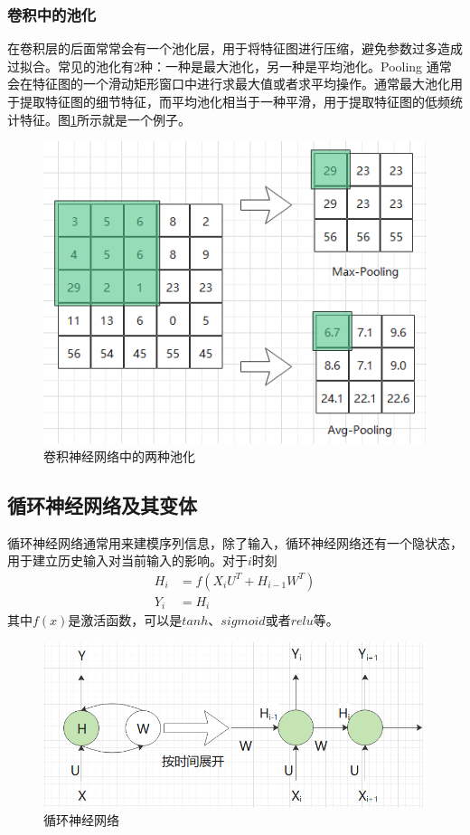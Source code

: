 \documentclass[twoside,a4paper,12pt]{book}%
\begin{document}
\subsubsection{卷积中的池化}
在卷积层的后面常常会有一个池化层，用于将特征图进行压缩，避免参数过多造成过拟合。常见的池化有2种：一种是最大池化，另一种是平均池化。Pooling 通常会在特征图的一个滑动矩形窗口中进行求最大值或者求平均操作。通常最大池化用于提取特征图的细节特征，而平均池化相当于一种平滑，用于提取特征图的低频统计特征。图\ref{fig:pooling1}所示就是一个例子。
\begin{figure}[htbp]
\begin{center}
\includegraphics[width=5.0in]{figures/pooling1.png}
\caption{卷积神经网络中的两种池化}\label{fig:pooling1}
\end{center}
\end{figure}
\subsection{循环神经网络及其变体}
循环神经网络通常用来建模序列信息，除了输入，循环神经网络还有一个隐状态，用于建立历史输入对当前输入的影响。对于$i$时刻
$$
\begin{aligned}
H_i&=f(X_iU^T+H_{i-1}W^T)\\
Y_i&=H_i
\end{aligned}
$$
其中$f(x)$是激活函数，可以是$tanh$、$sigmoid$或者$relu$等。
\begin{figure}[htbp]
\begin{center}
\includegraphics[width=5.5in]{figures/rnn2.png}
\caption{循环神经网络}
\label{default}
\end{center}
\end{figure}
\end{document}
